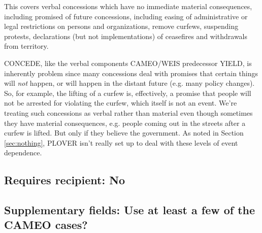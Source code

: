 \documentclass[11pt]{report}
\newcommand{\plcat}[1]{\textsf{#1}}
\newcommand{\ti}[1]{\textit{#1}}
\begin{document}
This covers verbal concessions which have no immediate material consequences, including promised of future concessions, including easing of administrative or legal restrictions on persons and organizations, remove curfews, suspending protests, declarations (but not implementations) of ceasefires and withdrawals from territory.

\plcat{CONCEDE}, like the verbal components CAMEO/WEIS predecessor \plcat{YIELD}, is inherently problem since many concessions deal with promises that certain things will \ti{not} happen, or will happen in the distant future (e.g. many policy changes). So, for example, the lifting of a curfew is, effectively, a promise that people will not be arrested for violating the curfew, which itself is not an event. We're treating such concessions as verbal rather than material even though sometimes they have material consequences, e.g. people coming out in the streets after a curfew is lifted. But only if they believe the government. As noted in Section \ref{sec:nothing}, PLOVER isn't really set up to deal with these levels of event dependence. 

\begin{comment}

pas 2016-10-20

I split CAMEO YIELD but and most of the old categories break out pretty easily but I'm still not quite sure the following belongs here

\item Yield by relinquishing political power, either via voluntary concessions or involuntary surrenders. Use this code when source surrenders power after being challenged through legitimate institutional channels (e.g. elections) or other coercive strategies (e.g. military coups). The target can either be the challenger(s) or the country as a whole.

ptb 2016-12-20
How does this interaction with the hex codings of negative events in PETR 2?

\end{comment}

\subsection{Requires recipient: No}

\subsection{Supplementary fields: Use at least a few of the CAMEO cases?}
\end{document}
